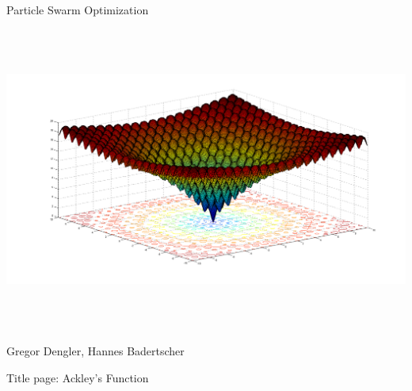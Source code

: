 
\begin{titlepage}
	\vspace{2cm}
	\begin{center}
	{	\huge
		Particle Swarm Optimization
	}
	\end{center}
	
		
	\vspace{3.5cm}
	\includegraphics[height=10cm]{images/title.png}
	\vspace{3.5cm}
	
	\begin{center}
		\large
		Gregor Dengler, Hannes Badertscher \\
		\vspace{5mm}
		\Date
	\end{center}
	
	\thispagestyle{empty} %
\end{titlepage}

\tableofcontents

\vspace{10mm}
{ \tiny
Title page: Ackley's Function
}
\newpage
